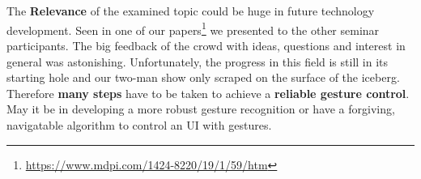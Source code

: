 \\
\\
The \textbf{Relevance} of the examined topic could be huge in future technology development. Seen in one of our papers\footnote{\url{https://www.mdpi.com/1424-8220/19/1/59/htm}} we presented to the other seminar participants. The big feedback of the crowd with ideas, questions and interest in general was astonishing. Unfortunately, the progress in this field is still in its starting hole and our two-man show only scraped on the surface of the iceberg. Therefore \textbf{many steps} have to be taken to achieve a \textbf{reliable gesture control}. May it be in developing a more robust gesture recognition or have a forgiving, navigatable algorithm to control an UI with gestures.



